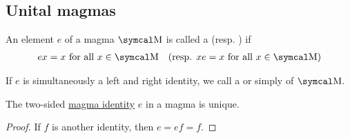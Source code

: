 \subsection{Unital magmas}\label{subsec:unital_magmas}

\begin{definition}\label{def:magma_identity}
  An element \( e \) of a magma \( \CM \) is called a  (resp. ) if
  \begin{align}\label{eq:def:magma_identity}
    ex = x \Tforall x \in \CM
    &&
    (\text{resp. } xe = x \Tforall x \in \CM)
  \end{align}

  If \( e \) is simultaneously a left and right identity, we call a  or simply  of \( \CM \).
\end{definition}

\begin{proposition}\label{thm:magma_identity_unique}
  The two-sided \hyperref[def:magma_identity]{magma identity} \( e \) in a magma is unique.
\end{proposition}
\begin{proof}
  If \( f \) is another identity, then \( e = ef = f \).
\end{proof}

